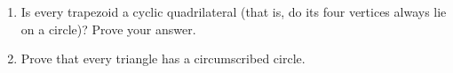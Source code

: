 \begin{enumerate}
\item[(a)] Is every trapezoid a cyclic quadrilateral (that is, do its four vertices always lie on a circle)? Prove your answer.
\item[(b)] Prove that every triangle has a circumscribed circle.
\end{enumerate}

